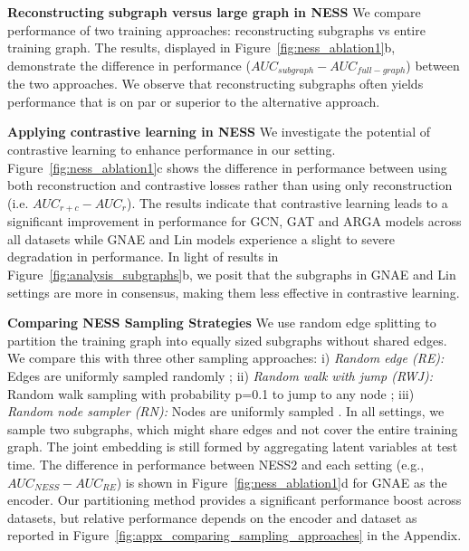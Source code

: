 \documentclass{article}
\begin{document}
\textbf{Reconstructing subgraph versus large graph in NESS}
We compare performance of two training approaches: reconstructing subgraphs vs entire training graph. The results, displayed in Figure~\ref{fig:ness_ablation1}b, demonstrate the difference in performance ($AUC_{subgraph}-AUC_{full-graph}$) between the two approaches. We observe that reconstructing subgraphs often yields performance that is on par or superior to the alternative approach. 

\textbf{Applying contrastive learning in NESS}
We investigate the potential of contrastive learning to enhance performance in our setting. Figure~\ref{fig:ness_ablation1}c shows the difference in performance between using both reconstruction and contrastive losses rather than using only reconstruction (i.e. $AUC_{r+c}-AUC_{r}$). The results indicate that contrastive learning leads to a significant improvement in performance for GCN, GAT and ARGA models across all datasets while GNAE and Lin models experience a slight to severe degradation in performance. In light of results in Figure~\ref{fig:analysis_subgraphs}b, we posit that the subgraphs in GNAE and Lin settings are more in consensus, making them less effective in contrastive learning.


\textbf{Comparing NESS Sampling Strategies}
We use random edge splitting to partition the training graph into equally sized subgraphs without shared edges. We compare this with three other sampling approaches: i) \textit{Random edge (RE):} Edges are uniformly sampled randomly \citep{krishnamurthy2005reducing}; ii) \textit{Random walk with jump (RWJ):} Random walk sampling with probability p=0.1 to jump to any node \citep{leskovec2006sampling}; iii) \textit{Random node sampler (RN):} Nodes are uniformly sampled \citep{stumpf2005subnets}. In all settings, we sample two subgraphs, which might share edges and not cover the entire training graph. The joint embedding is still formed by aggregating latent variables at test time. The difference in performance between NESS2 and each setting (e.g., $AUC_{NESS}-AUC_{RE}$) is shown in Figure~\ref{fig:ness_ablation1}d for GNAE as the encoder. Our partitioning method provides a significant performance boost across datasets, but relative performance depends on the encoder and dataset as reported in Figure~\ref{fig:appx_comparing_sampling_approaches} in the Appendix.
\end{document}
